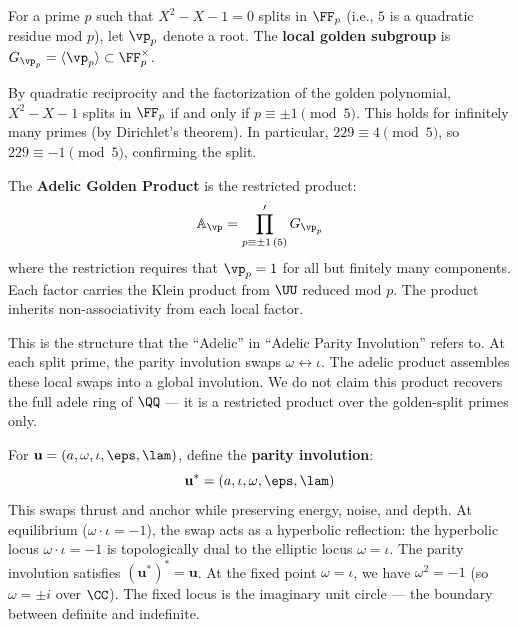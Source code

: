 \begin{definition}\label{def:local-golden}
For a prime $p$ such that $X^2 - X - 1 = 0$ splits in $\FF_p$ (i.e., $5$ is a quadratic residue mod $p$), let $\vp_p$ denote a root. The \textbf{local golden subgroup} is $G_{\vp_p} = \langle \vp_p \rangle \subset \FF_p^\times$.
\end{definition}

\begin{remark}
By quadratic reciprocity and the factorization of the golden polynomial, $X^2 - X - 1$ splits in $\FF_p$ if and only if $p \equiv \pm 1 \pmod{5}$. This holds for infinitely many primes (by Dirichlet's theorem). In particular, $229 \equiv 4 \pmod{5}$, so $229 \equiv -1 \pmod{5}$, confirming the split.
\end{remark}

\begin{definition}\label{def:adelic-product}
The \textbf{Adelic Golden Product} is the restricted product:
$$\mathbb{A}_\vp = \prod_{p \equiv \pm 1 \,(5)}' G_{\vp_p}$$
where the restriction requires that $\vp_p = 1$ for all but finitely many components. Each factor carries the Klein product from $\UU$ reduced mod $p$. The product inherits non-associativity from each local factor.
\end{definition}

This is the structure that the ``Adelic'' in ``Adelic Parity Involution'' refers to. At each split prime, the parity involution swaps $\omega \leftrightarrow \iota$. The adelic product assembles these local swaps into a global involution. We do not claim this product recovers the full adele ring of $\QQ$ --- it is a restricted product over the golden-split primes only.

\begin{definition}\label{def:monster}
For $\mathbf{u} = (a, \omega, \iota, \eps, \lam)$, define the \textbf{parity involution}:
$$\mathbf{u}^* = (a, \iota, \omega, \eps, \lam)$$
This swaps thrust and anchor while preserving energy, noise, and depth. At equilibrium ($\omega \cdot \iota = -1$), the swap acts as a hyperbolic reflection: the hyperbolic locus $\omega \cdot \iota = -1$ is topologically dual to the elliptic locus $\omega = \iota$. The parity involution satisfies $(\mathbf{u}^*)^* = \mathbf{u}$. At the fixed point $\omega = \iota$, we have $\omega^2 = -1$ (so $\omega = \pm i$ over $\CC$). The fixed locus is the imaginary unit circle --- the boundary between definite and indefinite.
\end{definition}

